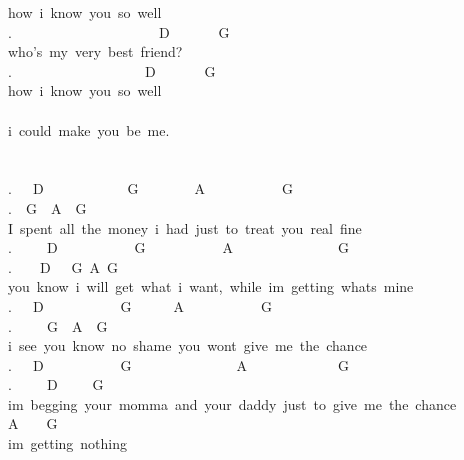 {how\ i\ know\ you\ so\ well\\
.\ \ \ \ \ \ \ \ \ \ \ \ \ \ \ \ \ \ \ \ \ D\ \ \ \ \ \ \ G\\
who's\ my\ very\ best\ friend?\\
.\ \ \ \ \ \ \ \ \ \ \ \ \ \ \ \ \ \ \ D\ \ \ \ \ \ \ G\\
how\ i\ know\ you\ so\ well\\
\\
i\ could\ make\ you\ be\ me.\\
\\
\\
.\ \ \ D\ \ \ \ \ \ \ \ \ \ \ \ G\ \ \ \ \ \ \ \ A\ \ \ \ \ \ \ \ \ \ \ G\ \ \ \ \ \ \ \ \ \ \ \ \ \\
.\ \ G\ \ A\ \ G\\
I\ spent\ all\ the\ money\ i\ had\ just\ to\ treat\ you\ real\ fine\\
.\ \ \ \ \ D\ \ \ \ \ \ \ \ \ \ \ G\ \ \ \ \ \ \ \ \ \ \ A\ \ \ \ \ \ \ \ \ \ \ \ \ \ \ G\ \ \ \ \ \ \ \\
.\ \ \ \ D\ \ \ G\ A\ G\\
you\ know\ i\ will\ get\ what\ i\ want,\ while\ im\ getting\ whats\ mine\\
.\ \ \ D\ \ \ \ \ \ \ \ \ \ \ G\ \ \ \ \ \ A\ \ \ \ \ \ \ \ \ \ \ G\ \ \ \ \ \ \ \ \ \ \ \\
.\ \ \ \ \ G\ \ A\ \ G\\
i\ see\ you\ know\ no\ shame\ you\ wont\ give\ me\ the\ chance\\
.\ \ \ D\ \ \ \ \ \ \ \ \ \ \ G\ \ \ \ \ \ \ \ \ \ \ \ \ \ \ A\ \ \ \ \ \ \ \ \ \ \ \ \ G\ \ \ \ \ \ \ \\
.\ \ \ \ \ D\ \ \ \ \ G\\
im\ begging\ your\ momma\ and\ your\ daddy\ just\ to\ give\ me\ the\ chance\\
A\ \ \ \ G\\
im\ getting\ nothing\\
}
